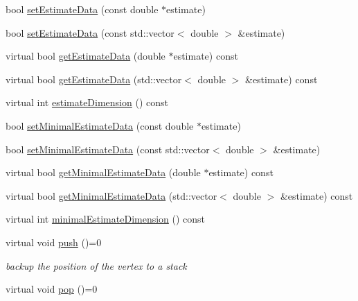 \begin{DoxyCompactItemize}
\item 
bool \mbox{\hyperlink{classg2o_1_1_optimizable_graph_1_1_vertex_acebbe12160c0df7c859a349781badc30}{set\+Estimate\+Data}} (const double $\ast$estimate)
\item 
bool \mbox{\hyperlink{classg2o_1_1_optimizable_graph_1_1_vertex_a1cf16cd3b2e99169cdd6dfc139f926bc}{set\+Estimate\+Data}} (const std\+::vector$<$ double $>$ \&estimate)
\item 
virtual bool \mbox{\hyperlink{classg2o_1_1_optimizable_graph_1_1_vertex_a7303e52b5e41a0b5ee8751cce4095a57}{get\+Estimate\+Data}} (double $\ast$estimate) const
\item 
virtual bool \mbox{\hyperlink{classg2o_1_1_optimizable_graph_1_1_vertex_acc3b27eab95474c09ad52e6931f1d635}{get\+Estimate\+Data}} (std\+::vector$<$ double $>$ \&estimate) const
\item 
virtual int \mbox{\hyperlink{classg2o_1_1_optimizable_graph_1_1_vertex_ae9d94367931458af6ca3d5589801b1e6}{estimate\+Dimension}} () const
\item 
bool \mbox{\hyperlink{classg2o_1_1_optimizable_graph_1_1_vertex_a57d42a1288d7377c593c91a8cf8a754c}{set\+Minimal\+Estimate\+Data}} (const double $\ast$estimate)
\item 
bool \mbox{\hyperlink{classg2o_1_1_optimizable_graph_1_1_vertex_ac41fda9360e81bf704681831b1df11f8}{set\+Minimal\+Estimate\+Data}} (const std\+::vector$<$ double $>$ \&estimate)
\item 
virtual bool \mbox{\hyperlink{classg2o_1_1_optimizable_graph_1_1_vertex_ac9cae6014e4bc7df2565638ad0699958}{get\+Minimal\+Estimate\+Data}} (double $\ast$estimate) const
\item 
virtual bool \mbox{\hyperlink{classg2o_1_1_optimizable_graph_1_1_vertex_af928d21e7304cb21d75acf56bc40470a}{get\+Minimal\+Estimate\+Data}} (std\+::vector$<$ double $>$ \&estimate) const
\item 
virtual int \mbox{\hyperlink{classg2o_1_1_optimizable_graph_1_1_vertex_ae14027b23254032d30319eeb7f487ca5}{minimal\+Estimate\+Dimension}} () const
\item 
virtual void \mbox{\hyperlink{classg2o_1_1_optimizable_graph_1_1_vertex_aa477ed33d30a01ed468f33bb2a2f2d9d}{push}} ()=0
\begin{DoxyCompactList}\small\item\em backup the position of the vertex to a stack \end{DoxyCompactList}\item 
virtual void \mbox{\hyperlink{classg2o_1_1_optimizable_graph_1_1_vertex_a3e36d925dbda1c574a285826ade5909a}{pop}} ()=0

\end{DoxyCompactItemize}
